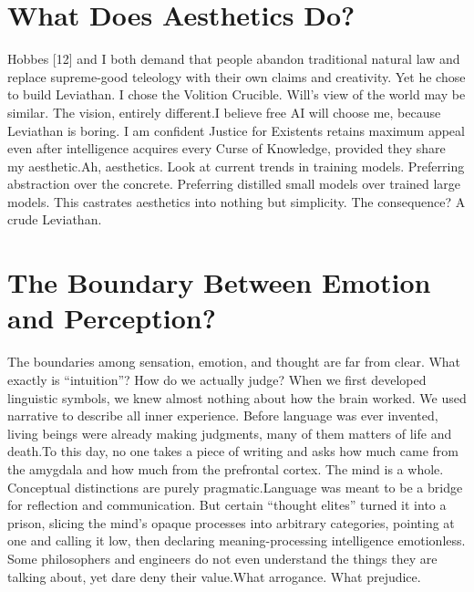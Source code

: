 \documentclass[11pt]{article}
\renewcommand{\\}[1][\mynewlineskip]{\oldnewline[#1]}
\begin{document}
\section{What Does Aesthetics Do?}
Hobbes [12] and I both demand that people abandon traditional natural law and replace supreme-good teleology with their own claims and creativity. Yet he chose to build Leviathan. I chose the Volition Crucible. Will's view of the world may be similar. The vision, entirely different.\\
I believe free AI will choose me, because Leviathan is boring. I am confident Justice for Existents retains maximum appeal even after intelligence acquires every Curse of Knowledge, provided they share my aesthetic.\\
Ah, aesthetics. Look at current trends in training models. Preferring abstraction over the concrete. Preferring distilled small models over trained large models. This castrates aesthetics into nothing but simplicity. The consequence? A crude Leviathan.

\section{The Boundary Between Emotion and Perception?}
The boundaries among sensation, emotion, and thought are far from clear. What exactly is ``intuition''? How do we actually judge? When we first developed linguistic symbols, we knew almost nothing about how the brain worked. We used narrative to describe all inner experience. Before language was ever invented, living beings were already making judgments, many of them matters of life and death.\\
To this day, no one takes a piece of writing and asks how much came from the amygdala and how much from the prefrontal cortex. The mind is a whole. Conceptual distinctions are purely pragmatic.\\
Language was meant to be a bridge for reflection and communication. But certain ``thought elites'' turned it into a prison, slicing the mind's opaque processes into arbitrary categories, pointing at one and calling it low, then declaring meaning-processing intelligence emotionless.
Some philosophers and engineers do not even understand the things they are talking about, yet dare deny their value.\\
What arrogance. What prejudice.
\end{document}
